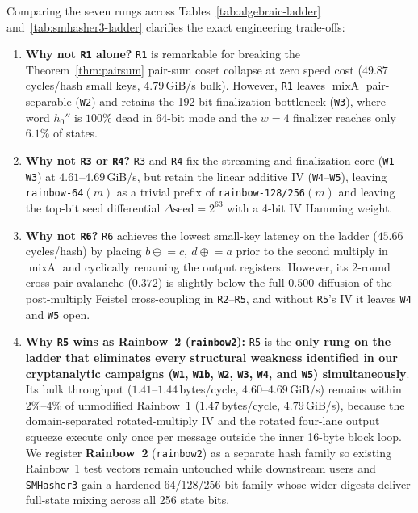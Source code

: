 \documentclass[10pt]{article}
\theoremstyle{definition}
\newcommand{\mixA}{\operatorname{mixA}}
\newcommand{\code}[1]{\texttt{#1}}
\begin{document}
Comparing the seven rungs across Tables~\ref{tab:algebraic-ladder} and~\ref{tab:smhasher3-ladder} clarifies the exact engineering trade-offs:
\begin{enumerate}
  \item \textbf{Why not \code{R1} alone?} \code{R1} is remarkable for breaking the Theorem~\ref{thm:pairsum} pair-sum coset collapse at zero speed cost ($49.87$\,cycles/hash small keys, $4.79$\,GiB/s bulk). However, \code{R1} leaves $\mixA$ pair-separable (\code{W2}) and retains the 192-bit finalization bottleneck (\code{W3}), where word $h_0''$ is $100\%$ dead in 64-bit mode and the $w=4$ finalizer reaches only $6.1\%$ of states.
  \item \textbf{Why not \code{R3} or \code{R4}?} \code{R3} and \code{R4} fix the streaming and finalization core (\code{W1}--\code{W3}) at $4.61$--$4.69$\,GiB/s, but retain the linear additive IV (\code{W4}--\code{W5}), leaving \code{rainbow-64}$(m)$ as a trivial prefix of \code{rainbow-128/256}$(m)$ and leaving the top-bit seed differential $\Delta\text{seed}=2^{63}$ with a 4-bit IV Hamming weight.
  \item \textbf{Why not \code{R6}?} \code{R6} achieves the lowest small-key latency on the ladder ($45.66$\,cycles/hash) by placing $b \mathrel{\oplus}= c,\ d \mathrel{\oplus}= a$ prior to the second multiply in $\mixA$ and cyclically renaming the output registers. However, its 2-round cross-pair avalanche ($0.372$) is slightly below the full $0.500$ diffusion of the post-multiply Feistel cross-coupling in \code{R2}--\code{R5}, and without \code{R5}'s IV it leaves \code{W4} and \code{W5} open.
  \item \textbf{Why \code{R5} wins as Rainbow~2 (\code{rainbow2}):} \code{R5} is the \textbf{only rung on the ladder that eliminates every structural weakness identified in our cryptanalytic campaigns (\code{W1}, \code{W1b}, \code{W2}, \code{W3}, \code{W4}, and \code{W5}) simultaneously}. Its bulk throughput ($1.41$--$1.44$\,bytes/cycle, $4.60$--$4.69$\,GiB/s) remains within $2\%$--$4\%$ of unmodified Rainbow~1 ($1.47$\,bytes/cycle, $4.79$\,GiB/s), because the domain-separated rotated-multiply IV and the rotated four-lane output squeeze execute only once per message outside the inner 16-byte block loop. We register \textbf{Rainbow~2} (\code{rainbow2}) as a separate hash family so existing Rainbow~1 test vectors remain untouched while downstream users and \code{SMHasher3} gain a hardened 64/128/256-bit family whose wider digests deliver full-state mixing across all 256 state bits.
\end{enumerate}
\end{document}
